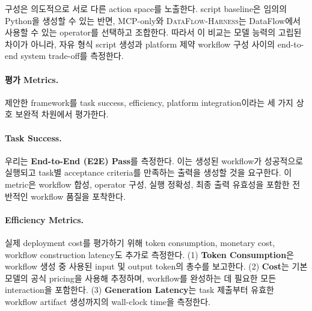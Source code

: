 구성은 의도적으로 서로 다른 action space를 노출한다. script baseline은 임의의 Python을 생성할 수 있는 반면, MCP-only와 \textsc{DataFlow-Harness}는 DataFlow에서 사용할 수 있는 operator를 선택하고 조합한다. 따라서 이 비교는 모델 능력의 고립된 차이가 아니라, 자유 형식 script 생성과 platform 제약 workflow 구성 사이의 end-to-end system trade-off를 측정한다.

\paragraph{\textbf{평가 Metrics.}}
제안한 framework를 task success, efficiency, platform integration이라는 세 가지 상호 보완적 차원에서 평가한다.

\paragraph{\textbf{Task Success.}}
우리는 \textbf{End-to-End (E2E) Pass}를 측정한다. 이는 생성된 workflow가 성공적으로 실행되고 task별 acceptance criteria를 만족하는 출력을 생성할 것을 요구한다. 이 metric은 workflow 합성, operator 구성, 실행 정확성, 최종 출력 유효성을 포함한 전반적인 workflow 품질을 포착한다.

\paragraph{\textbf{Efficiency Metrics.}}
실제 deployment cost를 평가하기 위해 token consumption, monetary cost, workflow construction latency도 추가로 측정한다. (1) \textbf{Token Consumption}은 workflow 생성 중 사용된 input 및 output token의 총수를 보고한다. (2) \textbf{Cost}는 기본 모델의 공식 pricing을 사용해 추정하며, workflow를 완성하는 데 필요한 모든 interaction을 포함한다. (3) \textbf{Generation Latency}는 task 제출부터 유효한 workflow artifact 생성까지의 wall-clock time을 측정한다.

